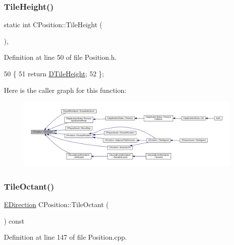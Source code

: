 \subsubsection{\texorpdfstring{Tile\+Height()}{TileHeight()}}
{\footnotesize\ttfamily static int C\+Position\+::\+Tile\+Height (\begin{DoxyParamCaption}{ }\end{DoxyParamCaption})\hspace{0.3cm}{\ttfamily [inline]}, {\ttfamily [static]}}



Definition at line 50 of file Position.\+h.


\begin{DoxyCode}
50                                \{
51             \textcolor{keywordflow}{return} \hyperlink{classCPosition_a202ebb83e86df75cfb76cf1241ba817c}{DTileHeight};  
52         \};
\end{DoxyCode}
Here is the caller graph for this function\+:
\nopagebreak
\begin{figure}[H]
\begin{center}
\leavevmode
\includegraphics[width=350pt]{classCPosition_ac4f0edd9c9632f1bdca981ef5d9b71e5_icgraph}
\end{center}
\end{figure}
\hypertarget{classCPosition_a6acbc9445751b0a040c2971720f00088}{}\label{classCPosition_a6acbc9445751b0a040c2971720f00088} 
\subsubsection{\texorpdfstring{Tile\+Octant()}{TileOctant()}}
{\footnotesize\ttfamily \hyperlink{GameDataTypes_8h_acb2b033915f6659a71a38b5aa6e4eb42}{E\+Direction} C\+Position\+::\+Tile\+Octant (\begin{DoxyParamCaption}{ }\end{DoxyParamCaption}) const}



Definition at line 147 of file Position.\+cpp.


